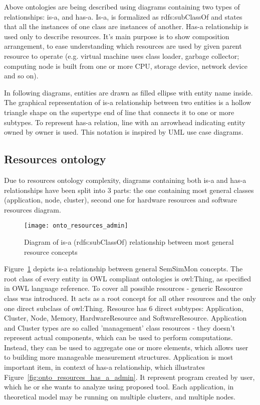 Above ontologies are being described using diagrams containing two types of relationships: is-a, and has-a. Is-a, is
formalized as rdfs:subClassOf and states that all the instances of one class are instances of
another\cite{rdfRef:2004}. Has-a relationship is used only to describe resources. It's main purpose is to show
composition arrangement, to ease understanding which resources are used by given parent resource to operate (e.g.
virtual machine uses class loader, garbage collector; computing node is built from one or more CPU, storage device,
network device and so on).

In following diagrams, entities are drawn as filled ellipse with entity name inside. The graphical representation of
is-a relationship between two entities is a hollow triangle shape on the supertype end of line that connects it to one
or more subtypes. To represent has-a relation, line with an arrowhead indicating entity owned by owner is used. This
notation is inspired by UML use case diagrams.

\pagebreak

\subsection{Resources ontology}
\label{subsec:arch_knowledge_resources}

Due to resources ontology complexity, diagrams containing both is-a and has-a relationships have been split into 3
parts: the one containing most general classes (application, node, cluster), second one for hardware resources
and software resources diagram.

\begin{figure}[ht]
  \centering
  \texttt{[image: onto\_resources\_admin]}
  \caption{Diagram of is-a (rdfs:subClassOf) relationship between most general resource concepts}
  \label{fig:onto_resources_admin}
\end{figure}



Figure~\ref{fig:onto_resources_admin} depicts is-a relationship between general SemSimMon concepts. The root class of
every entity in OWL compliant ontologies is owl:Thing, as specified in OWL language reference\cite{owlRef:2004}. To
cover all possible resources - generic Resource class was introduced. It acts as a root concept for all other resources
and the only one direct subclass of owl:Thing. Resource has 6 direct subtypes: Application, Cluster, Node, Memory,
HardwareResource and SoftwareResource. Application and Cluster types are so called 'management' class resources - they
doesn't represent actual components, which can be used to perform computations. Instead, they can be used to aggregate
one or more elements, which allows user to building more manageable measurement structures. Application is most
important item, in context of has-a relationship, which illustrates Figure~\ref{fig:onto_resources_has_a_admin}. It
represent program created by user, which he or she wants to analyze using proposed tool. Each application, in
theoretical model may be running on multiple clusters, and multiple nodes.

